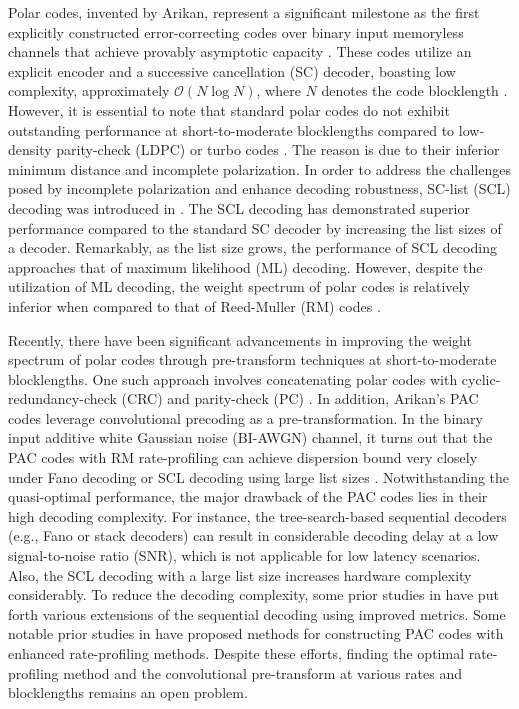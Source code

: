 \documentclass[conference]{IEEEtran}
\begin{document}
Polar codes, invented by Arikan, represent a significant milestone as the first explicitly constructed error-correcting codes over binary input memoryless channels that achieve provably asymptotic capacity \cite{arikan-polar}. These codes utilize an explicit encoder and a successive cancellation (SC) decoder, boasting low complexity, approximately $\mathcal{O}(N \log N)$, where $N$ denotes the code blocklength \cite{arikan-polar}. However, it is essential to note that standard polar codes do not exhibit outstanding performance at short-to-moderate blocklengths compared to low-density parity-check (LDPC) or turbo codes \cite{Hui-5G-coding-comparison}. The reason is due to their inferior minimum distance and incomplete polarization. In order to address the challenges posed by incomplete polarization and enhance decoding robustness, SC-list (SCL) decoding was introduced in \cite{Tal-polar-SCL, Balatsoukas-SCL-log}. The SCL decoding has demonstrated superior performance compared to the standard SC decoder by increasing the list sizes of a decoder. Remarkably, as the list size grows, the performance of SCL decoding approaches that of maximum likelihood (ML) decoding. However, despite the utilization of ML decoding, the weight spectrum of polar codes is relatively inferior when compared to that of Reed-Muller (RM) codes \cite{mondelli-urbanke-polar2RM, li-tse-rm-polar, Abbe-Reed-Muller}. 


Recently, there have been significant advancements in improving the weight spectrum of polar codes through pre-transform techniques at short-to-moderate blocklengths. One such approach involves concatenating polar codes with cyclic-redundancy-check (CRC) \cite{Tal-polar-SCL, Niu-CA-polar} and parity-check (PC) \cite{Wang-PCC-polar, Trifonov-polar-dynamic-frozen, Trifonov-polar-subcode, Zhang-PC-polar-Huawei}. In addition,  Arikan's PAC codes \cite{arikan-pac} leverage convolutional precoding as a pre-transformation. In the binary input additive white Gaussian noise (BI-AWGN) channel, it turns out that the PAC codes with RM rate-profiling can achieve dispersion bound very closely under Fano decoding or SCL decoding using large list sizes \cite{arikan-pac, moradi-pac, vardy-pac}. Notwithstanding the quasi-optimal performance, the major drawback of the PAC codes lies in their high decoding complexity. For instance, the tree-search-based sequential decoders (e.g., Fano or stack decoders) can result in considerable decoding delay at a low signal-to-noise ratio (SNR), which is not applicable for low latency scenarios. Also, the SCL decoding with a large list size increases hardware complexity considerably. To reduce the decoding complexity, some prior studies in \cite{Moradi-PAC-Fano-metric, Rowshan-PAC-Fano-metric} have put forth various extensions of the sequential decoding using improved metrics. Some notable prior studies in \cite{Liu-PAC-construction, Rowshan-PAC-construction, Moradi-pac-monte-carlo, Miloslavskaya-recursive-design, Chiu-PAC-consgruction} have proposed methods for constructing PAC codes with enhanced rate-profiling methods. Despite these efforts, finding the optimal rate-profiling method and the convolutional pre-transform at various rates and blocklengths remains an open problem.
\end{document}
